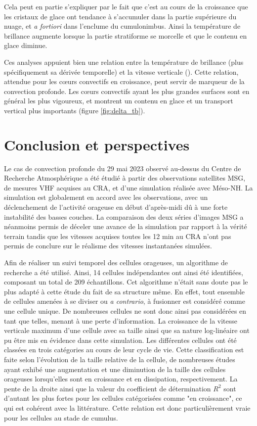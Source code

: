 \documentclass[12pt]{article}
\begin{document}
\begin{multicols}{2}

Cela peut en partie s'expliquer par le fait que c'est au cours de la croissance que les cristaux de glace ont tendance à s'accumuler dans la partie supérieure du nuage, et \textit{a fortiori} dans l'enclume du cumulonimbus. Ainsi la température de brillance augmente lorsque la partie stratiforme se morcelle et que le contenu en glace diminue. 

Ces analyses appuient bien une relation entre la température de brillance (plus spécifiquement sa dérivée temporelle) et la vitesse verticale (\cite{Chaboureau}). Cette relation, attendue pour les c\oe urs convectifs en croissance, peut servir de marqueur de la convection profonde. Les c\oe urs convectifs ayant les plus grandes surfaces sont en général les plus vigoureux, et montrent un contenu en glace et un transport vertical plus importants (figure \ref{fig:delta_tb}). 

\section{Conclusion et perspectives}

Le cas de convection profonde du 29 mai 2023 observé au-dessus du Centre de Recherche Atmosphérique a été étudié à partir des observations satellites MSG, de mesures VHF acquises au CRA, et d'une simulation réalisée avec Méso-NH. La simulation est globalement en accord avec les observations, avec un déclenchement de l'activité orageuse en début d'après-midi dû à une forte instabilité des basses couches. La comparaison des deux séries d'images MSG a néanmoins permis de déceler une avance de la simulation par rapport à la vérité terrain tandis que les vitesses acquises toutes les 12 min au CRA n'ont pas permis de conclure sur le réalisme des vitesses instantanées simulées.

Afin de réaliser un suivi temporel des cellules orageuses, un algorithme de recherche a été utilisé. Ainsi, 14 cellules indépendantes ont ainsi été identifiées, composant un total de 209 échantillons. Cet algorithme n'était sans doute pas le plus adapté à cette étude du fait de sa structure même. En effet, tout ensemble de cellules amenées à se diviser ou \textit{a contrario}, à fusionner est considéré comme une cellule unique. De nombreuses cellules ne sont donc ainsi pas considérées en tant que telles, menant à une perte d'information. La croissance de la vitesse verticale maximum d’une cellule avec sa taille ainsi que sa nature log-linéaire ont pu être mis en évidence dans cette simulation. Les différentes cellules ont été classées en trois catégories au cours de leur cycle de vie. Cette classification est faite selon l’évolution de la taille relative de la cellule, de nombreuses études ayant exhibé une augmentation et une diminution de la taille des cellules orageuses lorsqu’elles sont en croissance et en dissipation, respectivement. La pente de la droite ainsi que la valeur du coefficient de détermination $R^2$ sont d’autant les plus fortes pour les cellules catégorisées comme "en croissance", ce qui est cohérent avec la littérature. Cette relation est donc particulièrement vraie pour les cellules au stade de cumulus.


\end{multicols}
\end{document}
